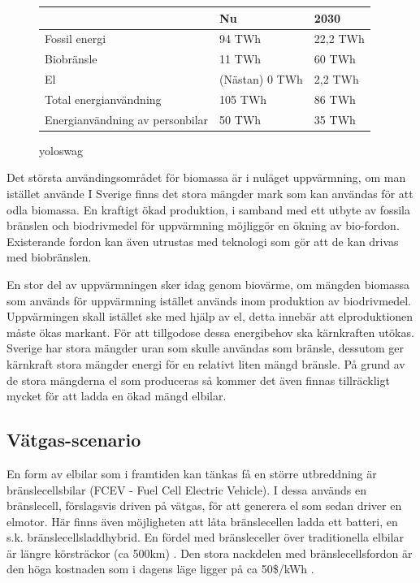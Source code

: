 \documentclass[a4paper,11pt,fleqn, titlepage]{article}
\begin{document}
\begin{figure}[h!]
	\begin{center}
	\begin{tabular}{ | l | l | l | }
	\hline
						& Nu		& 2030 \\ \hline
	Fossil energi				& 94 TWh	& 22,2 TWh \\ \hline
	Biobränsle				& 11 TWh	& 60 TWh \\ \hline %
	El					& (Nästan) 0 TWh &  2,2 TWh \\ \hline %
	Total energianvändning		& 105 TWh	& 86 TWh \\ \hline
	Energianvändning av personbilar	& 50 TWh	& 35 TWh \\ \hline
	\end{tabular}
	\caption{yoloswag}
	\label{tab:scen1energi}
\end{center}
\end{figure}



Det största användingsområdet för biomassa är i nuläget uppvärmning, om man istället använde
I Sverige finns det stora mängder mark som kan användas för att odla biomassa. En kraftigt ökad produktion, i samband med ett utbyte av fossila bränslen och biodrivmedel för uppvärmning möjliggör en ökning av bio-fordon. Existerande fordon kan även utrustas med teknologi som gör att de kan drivas med biobränslen.

En stor del av uppvärmningen sker idag genom biovärme, om mängden biomassa som används för uppvärmning istället används inom produktion av biodrivmedel. Uppvärmingen skall istället ske med hjälp av el, detta innebär att elproduktionen måste ökas markant. För att tillgodose dessa energibehov ska kärnkraften utökas. Sverige har stora mängder uran som skulle användas som bränsle, dessutom ger kärnkraft stora mängder energi för en relativt liten mängd bränsle. På grund av de stora mängderna el som produceras så kommer det även finnas tillräckligt mycket för att ladda en ökad mängd elbilar.

\subsection{Vätgas-scenario}
En form av elbilar som i framtiden kan tänkas få en större utbreddning är
bränslecellsbilar (FCEV - Fuel Cell Electric Vehicle). I dessa används en
bränslecell, förslagsvis driven på vätgas, för att generera el som sedan
driver en elmotor. Här finns även möjligheten att låta bränslecellen ladda
ett batteri, en s.k. bränslecellsladdhybrid. En fördel med bränsleceller
över traditionella elbilar är längre körsträckor (ca 500km)
\cite{fossilfrihet}. Den stora nackdelen med bränslecellsfordon är den höga
kostnaden som i dagens läge ligger på ca 50\$/kWh \cite{fossilfrihet}.
\end{document}

